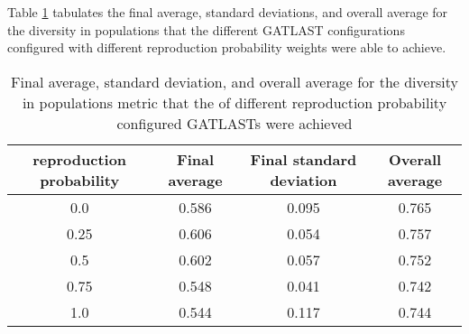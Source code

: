 Table \ref{tab:HP:GA:reproductionProp:diversity in populations} tabulates the final average, standard deviations, and overall average for the diversity in populations that the different GATLAST configurations configured with different reproduction probability weights were able to achieve.
\begin{table}[tbh!]
\centering
\begin{adjustbox}{trim=0cm 0cm 0cm 0cm, clip=true}
\begin{tabular}{|c|c|c|c|}
\hline
reproduction probability & Final average & Final standard deviation & Overall average\\
\hline
0.0 & 0.586 & 0.095 & 0.765\\\hline
0.25 & 0.606 & 0.054 & 0.757\\\hline
0.5 & 0.602 & 0.057 & 0.752\\\hline
0.75 & 0.548 & 0.041 & 0.742\\\hline
1.0 & 0.544 & 0.117 & 0.744\\\hline
\end{tabular}
\end{adjustbox}
\caption{Final average, standard deviation, and overall average for the diversity in populations metric that the of different reproduction probability configured GATLASTs were achieved}
\label{tab:HP:GA:reproductionProp:diversity in populations}
\end{table}